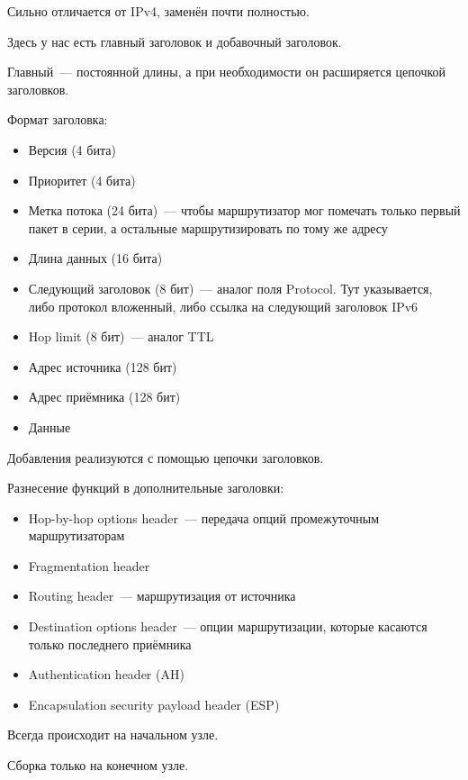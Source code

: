
Сильно отличается от IPv4, заменён почти полностью.


Здесь у нас есть главный заголовок и добавочный заголовок.

Главный~--- постоянной длины, а при необходимости он расширяется цепочкой заголовков.

Формат заголовка:
\begin{itemize}
    \item Версия (4 бита)
    \item Приоритет (4 бита)
    \item Метка потока (24 бита)~--- чтобы маршрутизатор мог помечать только первый пакет в серии, а остальные маршрутизировать по тому же адресу
    \item Длина данных (16 бита)
    \item Следующий заголовок (8 бит)~--- аналог поля Protocol. Тут указывается, либо протокол вложенный, либо ссылка на следующий заголовок IPv6
    \item Hop limit (8 бит)~--- аналог TTL
    \item Адрес источника (128 бит)
    \item Адрес приёмника (128 бит)
    \item Данные
\end{itemize}

Добавления реализуются с помощью цепочки заголовков.

Разнесение функций в дополнительные заголовки:
\begin{itemize}
    \item Hop-by-hop options header~--- передача опций промежуточным маршрутизаторам
    \item Fragmentation header
    \item Routing header~--- маршрутизация от источника
    \item Destination options header~--- опции маршрутизации, которые касаются только последнего приёмника
    \item Authentication header (AH)
    \item Encapsulation security payload header (ESP)
\end{itemize}


Всегда происходит на начальном узле.

Сборка только на конечном узле.

